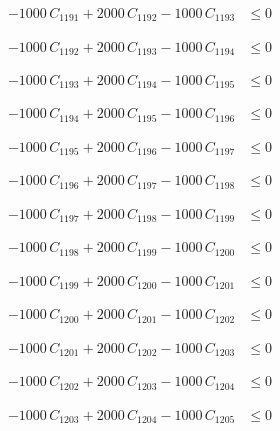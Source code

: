 \documentclass[a4paper,11pt]{article}
\begin{document}
\begin{align}
-1000\,C_{1191} + 2000\,C_{1192} - 1000\,C_{1193} &\leq 0 \nonumber
\end{align}

\begin{align}
-1000\,C_{1192} + 2000\,C_{1193} - 1000\,C_{1194} &\leq 0 \nonumber
\end{align}

\begin{align}
-1000\,C_{1193} + 2000\,C_{1194} - 1000\,C_{1195} &\leq 0 \nonumber
\end{align}

\begin{align}
-1000\,C_{1194} + 2000\,C_{1195} - 1000\,C_{1196} &\leq 0 \nonumber
\end{align}

\begin{align}
-1000\,C_{1195} + 2000\,C_{1196} - 1000\,C_{1197} &\leq 0 \nonumber
\end{align}

\begin{align}
-1000\,C_{1196} + 2000\,C_{1197} - 1000\,C_{1198} &\leq 0 \nonumber
\end{align}

\begin{align}
-1000\,C_{1197} + 2000\,C_{1198} - 1000\,C_{1199} &\leq 0 \nonumber
\end{align}

\begin{align}
-1000\,C_{1198} + 2000\,C_{1199} - 1000\,C_{1200} &\leq 0 \nonumber
\end{align}

\begin{align}
-1000\,C_{1199} + 2000\,C_{1200} - 1000\,C_{1201} &\leq 0 \nonumber
\end{align}

\begin{align}
-1000\,C_{1200} + 2000\,C_{1201} - 1000\,C_{1202} &\leq 0 \nonumber
\end{align}

\begin{align}
-1000\,C_{1201} + 2000\,C_{1202} - 1000\,C_{1203} &\leq 0 \nonumber
\end{align}

\begin{align}
-1000\,C_{1202} + 2000\,C_{1203} - 1000\,C_{1204} &\leq 0 \nonumber
\end{align}

\begin{align}
-1000\,C_{1203} + 2000\,C_{1204} - 1000\,C_{1205} &\leq 0 \nonumber
\end{align}
\end{document}
